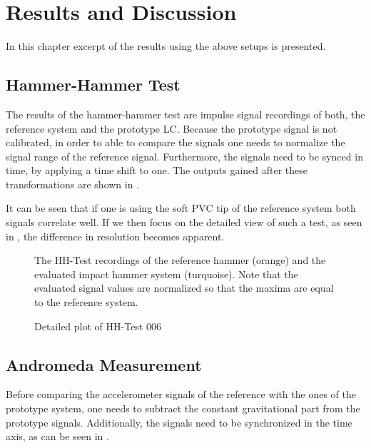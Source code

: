 \chapter{Results and Discussion}
\label{chap:results}

In this chapter excerpt of the results using the above setups is presented.

\section{Hammer-Hammer Test}

The results of the hammer-hammer test are impulse signal recordings of both, the reference system and the prototype \ac{LC}. Because the prototype signal is not calibrated, in order to able to compare the signals one needs to normalize the signal range of the reference signal. Furthermore, the signals need to be synced in time, by applying a time shift to one. The outputs gained after these transformations are shown in .

It can be seen that if one is using the soft PVC tip of the reference system both signals correlate well. If we then focus on the detailed view of such a test, as seen in , the difference in resolution becomes apparent.

\begin{figure}[!htb]
  \centering
  
  \caption[HH-Test comparison]{The HH-Test recordings of the reference hammer (orange) and the evaluated impact hammer system (turquoise). Note that the evaluated signal values are normalized so that the maxima are equal to the reference system.%
    \label{fig:HH_comparison}}
\end{figure}
\begin{figure}[!htb]
  \centering
  
  \caption[HH006 Plot]{Detailed plot of HH-Test 006%
    \label{fig:HH_noise}}
\end{figure}

\section{Andromeda Measurement}
Before comparing the accelerometer signals of the reference with the ones of the prototype system, one needs to subtract the constant gravitational part from the prototype signals. Additionally, the signals need to be synchronized in the time axis, as can be seen in .

